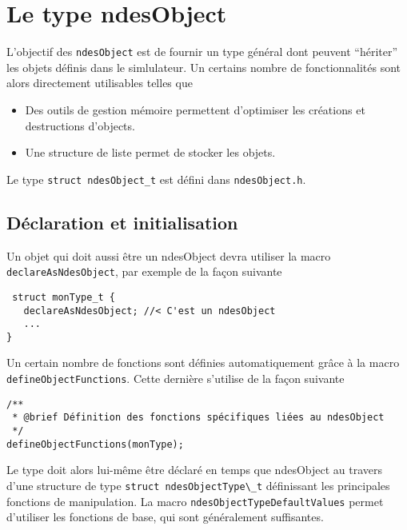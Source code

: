 %
\section{Le type ndesObject}

   L'objectif des {\tt ndesObject} est de fournir un type général dont
peuvent ``hériter'' les objets définis dans le simlulateur. Un
certains nombre de fonctionnalités sont alors directement utilisables
telles que

\begin{itemize}
   \item Des outils de gestion mémoire permettent d'optimiser les
     créations et destructions d'objects.
   \item Une structure de liste permet de stocker les objets.
\end{itemize}

   Le type {\tt struct ndesObject\_t} est défini dans {\tt ndesObject.h}.

%
\subsection{Déclaration et initialisation}

   Un objet qui doit aussi être un ndesObject devra utiliser la macro
\lstinline{declareAsNdesObject}, par exemple de la façon suivante


\begin{verbatim}
 struct monType_t {
   declareAsNdesObject; //< C'est un ndesObject 
   ...
}
\end{verbatim}

   Un certain nombre de fonctions sont définies automatiquement grâce
à la macro \lstinline{defineObjectFunctions}. Cette dernière s'utilise
de la façon suivante

\begin{verbatim}
/**
 * @brief Définition des fonctions spécifiques liées au ndesObject
 */
defineObjectFunctions(monType);
\end{verbatim}

   Le type doit alors lui-même être déclaré en temps que ndesObject au
travers d'une structure de type \lstinline{struct ndesObjectType\_t}
définissant les principales fonctions de manipulation. La macro
\lstinline{ndesObjectTypeDefaultValues} permet d'utiliser les
fonctions de base, qui sont généralement suffisantes.

